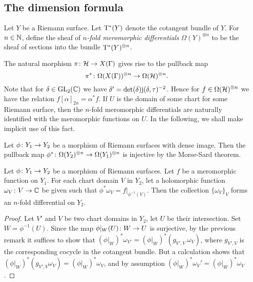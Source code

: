 \subsection{The dimension formula}

\begin{defi}
 Let $Y$ be a Riemann surface. Let $\mathrm{T}^*(Y)$ denote the cotangent bundle of $Y$. For $n\in\mathbb{N}$, define the sheaf of \emph{$n$-fold meromorphic differentials} $\Omega(Y)^{\otimes n}$ to be the sheaf of sections into the bundle $\mathrm{T}^*(Y)^{\otimes n}$.
\end{defi}

The natural morphism $\pi\colon\mathcal{H}\to X(\Gamma)$ gives rise to the pullback map \[\pi^*\colon\Omega(X(\Gamma))^{\otimes n}\to\Omega(\mathcal{H})^{\otimes n}.\]
Note that for $\delta\in\operatorname{GL}_2(\mathbb{C})$ we have $\delta'=\det(\delta)\mathrm{j}(\delta,\tau)^{-2}$. Hence for $f\in\Omega(\mathcal{H})^{\otimes n}$ we have the relation $f[\alpha]_{2n} = \alpha^* f$.
If $U$ is the domain of some chart for some Riemann surface, then the $n$-fold meromorphic differentials are naturally identified with the meromorphic functions on $U$. In the following, we shall make implicit use of this fact.

\begin{rmk} \label{pr:morse-sard}
 Let $\phi\colon Y_1\to Y_2$ be a morphism of Riemann surfaces with dense image. Then the pullback map $\phi^*\colon\Omega(Y_2)^{\otimes n}\to\Omega(Y_1)^{\otimes n}$ is injective by the Morse-Sard theorem.
\end{rmk}

\begin{prop} \label{pr:gluing-differentials}
 Let $\phi\colon Y_1\to Y_2$ be a morphism of Riemann surfaces. Let $f$ be a meromorphic function on $Y_1$. For each chart domain $V$ in $Y_2$, let a holomorphic function $\omega_V\colon V\to \mathbb{C}$ be given such that $\phi^*\omega_V=f|_{\phi^{-1}(V)}$. Then the collection $\{\omega_V\}_V$ forms an $n$-fold differential on $Y_2$.
\end{prop}

\begin{proof}
 Let $V'$ and $V$ be two chart domains in $Y_2$, let $U$ be their intersection. Set $W=\phi^{-1}(U)$. Since the map $\phi|_W(U)\colon W\to U$ is surjective, by the previous remark it suffices to show that $(\phi|_W)^*\omega_{V'}=(\phi|_W)^*(g_{V',V}\ \omega_V)$, where $g_{V',V}$ is the corresponding cocycle in the cotangent bundle. But a calculation shows that $(\phi|_W)^*(g_{V',V}\omega_V)=(\phi|_W)^* \omega_V$, and by assumption $(\phi|_W)^* \omega_V' = (\phi|_W)^* \omega_V$.
\end{proof}

